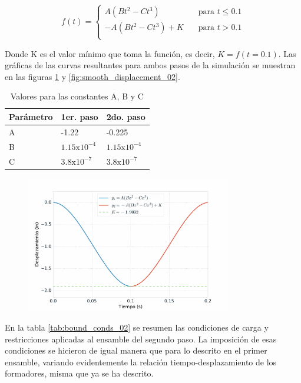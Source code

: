 \begin{equation}
f(t) = \left\{\begin{matrix}
A(Bt^2 - Ct^3) \,\,\,\,\,\, &  \text{para} \,\, t \leq 0.1 \\
-A(Bt^2 - Ct^3) + K \,\,\,\,\,\,& \text{para} \,\, t > 0.1 \\
\end{matrix}\right.
\end{equation}

Donde K es el valor mínimo que toma la función, es decir, $K = f(t=0.1)$. Las gráficas de 
las curvas resultantes para ambos pasos de la simulación se muestran en las figuras 
\ref{fig:smooth_displacement_01} y \ref{fig:smooth_displacement_02}.

\begin{table}[H]
\centering
\caption{Valores para las constantes A, B y C}
\label{}
\begin{tabular}{p{3cm} p{2cm} p{2cm}} \hline
Parámetro & 1er. paso & 2do. paso \\
\hline
A & -1.22 & -0.225 \\
B & $1.15\text{x}10^{-4}$ & $1.15\text{x}10^{-4}$ \\
C & $3.8\text{x}10^{-7}$ & $3.8\text{x}10^{-7}$ \\
\hline
\end{tabular}
\label{tab:smooth_step_constants}
\end{table}

\begin{figure}[H]
\centering
\includegraphics[width=0.8\textwidth]{src/ch3/smooth_displacement_01.pdf}
\label{fig:smooth_displacement_01}
\end{figure}

En la tabla \ref{tab:bound_conds_02} se resumen las condiciones de carga y restricciones aplicadas 
al ensamble del segundo paso. La imposición de esas condiciones se hicieron de igual manera que para 
lo descrito en el primer ensamble, variando evidentemente la relación tiempo-desplazamiento de los 
formadores, misma que ya se ha descrito.

